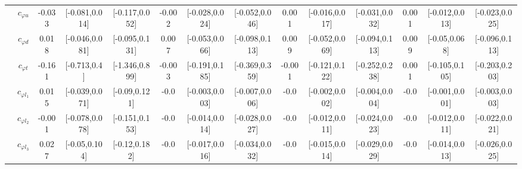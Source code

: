 \documentclass{article}
\begin{document}
\begin{table}[H]
\begin{tabular}{|c|c|c|c|c|c|c|c|c|c|c|c|c|c|}
 & $c_{\varphi u}$ & -0.033                             & [-0.081,0.014]                                 & [-0.117,0.052] & -0.002                             & [-0.028,0.024]                                 & [-0.052,0.046] & 0.001                             & [-0.016,0.017]                                 & [-0.031,0.032] & 0.001                             & [-0.012,0.013]                                 & [-0.023,0.025] \\ \cline{2-14}
 & $c_{\varphi d}$ & 0.018                             & [-0.046,0.081]                                 & [-0.095,0.131] & 0.007                             & [-0.053,0.066]                                 & [-0.098,0.113] & 0.009                             & [-0.052,0.069]                                 & [-0.094,0.113] & 0.009                             & [-0.05,0.068]                                 & [-0.096,0.113] \\ \cline{2-14}
 & $c_{\varphi t}$ & -0.161                             & [-0.713,0.4]                                 & [-1.346,0.899] & -0.003                             & [-0.191,0.185]                                 & [-0.369,0.359] & -0.001                             & [-0.121,0.122]                                 & [-0.252,0.238] & 0.001                             & [-0.105,0.105]                                 & [-0.203,0.203] \\ \cline{2-14}
 & $c_{\varphi l_1}$ & 0.015                             & [-0.039,0.071]                                 & [-0.09,0.121] & -0.0                             & [-0.003,0.003]                                 & [-0.007,0.006] & -0.0                             & [-0.002,0.002]                                 & [-0.004,0.004] & -0.0                             & [-0.001,0.001]                                 & [-0.003,0.003] \\ \cline{2-14}
 & $c_{\varphi l_2}$ & -0.001                             & [-0.078,0.078]                                 & [-0.151,0.153] & -0.0                             & [-0.014,0.014]                                 & [-0.028,0.027] & -0.0                             & [-0.012,0.011]                                 & [-0.024,0.023] & -0.0                             & [-0.012,0.011]                                 & [-0.022,0.021] \\ \cline{2-14}
 & $c_{\varphi l_3}$ & 0.027                             & [-0.05,0.104]                                 & [-0.12,0.182] & -0.0                             & [-0.017,0.016]                                 & [-0.034,0.032] & -0.0                             & [-0.015,0.014]                                 & [-0.029,0.029] & -0.0                             & [-0.014,0.013]                                 & [-0.026,0.025] \\ \cline{2-14}

\end{tabular}
\end{table}
\end{document}

